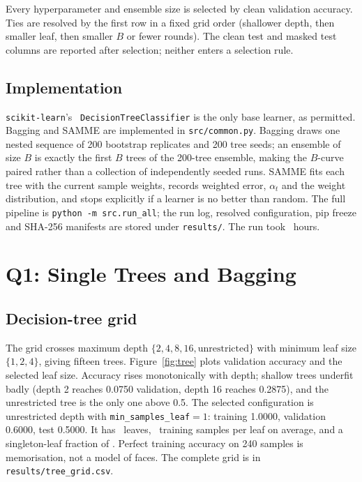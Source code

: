 \documentclass[10pt,twocolumn,letterpaper]{article}
\begin{document}
Every hyperparameter and ensemble size is selected by clean validation
accuracy.  Ties are resolved by the first row in a fixed grid order (shallower
depth, then smaller leaf, then smaller $B$ or fewer rounds).  The clean test and
masked test columns are reported after selection; neither enters a selection
rule.

\subsection{Implementation}

\texttt{scikit-learn}'s~\cite{pedregosa2011}
\texttt{DecisionTreeClassifier} is the only base learner, as permitted.
Bagging and SAMME are implemented in \texttt{src/common.py}.  Bagging draws one
nested sequence of 200 bootstrap replicates and 200 tree seeds; an ensemble of
size $B$ is exactly the first $B$ trees of the 200-tree ensemble, making the
$B$-curve paired rather than a collection of independently seeded runs.  SAMME
fits each tree with the current sample weights, records weighted error,
$\alpha_t$ and the weight distribution, and stops explicitly if a learner is no
better than random.  The full pipeline is \texttt{python -m src.run\_all}; the
run log, resolved configuration, pip freeze and SHA-256 manifests are stored
under \texttt{results/}.  The run took \RuntimeHours~hours.

\section{Q1: Single Trees and Bagging}

\subsection{Decision-tree grid}

The grid crosses maximum depth $\{2,4,8,16,\text{unrestricted}\}$ with minimum
leaf size $\{1,2,4\}$, giving fifteen trees.  Figure~\ref{fig:tree} plots
validation accuracy and the selected leaf size.  Accuracy rises monotonically
with depth; shallow trees underfit badly (depth 2 reaches 0.0750 validation,
depth 16 reaches 0.2875), and the unrestricted tree is the only one above 0.5.
The selected configuration is unrestricted depth with
\texttt{min\_samples\_leaf}$=1$: training 1.0000, validation 0.6000, test
0.5000.  It has \TreeLeaves~leaves, \TreeMeanLeaf~training samples per leaf on
average, and a singleton-leaf fraction of \TreeSingleton.  Perfect training
accuracy on 240 samples is memorisation, not a model of faces.  The complete
grid is in \texttt{results/tree\_grid.csv}.
\end{document}

